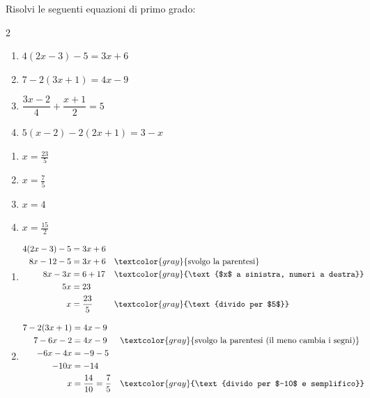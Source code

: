 
\begin{question}[ID=2.4, subtitle={Equazioni di primo grado}, difficulty=media, tags={equazioni lineari}]
Risolvi le seguenti equazioni di primo grado:
\begin{multicols}{2}
\begin{enumerate}[leftmargin=3cm]
    \item $4(2x-3) - 5 = 3x + 6$
    \item $7 - 2(3x+1) = 4x - 9$
    \item $\dfrac{3x-2}{4} + \dfrac{x+1}{2} = 5$
    \item $5(x-2) - 2(2x+1) = 3 - x$
\end{enumerate}
\end{multicols}
\begin{solution}
\begin{enumerate}
    \item $x=\tfrac{23}{5}$
    \item $x=\tfrac{7}{5}$
    \item $x=4$
    \item $x=\tfrac{15}{2}$
\end{enumerate}
\end{solution}
\begin{explanation}
\begin{enumerate}
    \item \[\begin{aligned}
    4(2x-3)-5 &= 3x+6\\
    8x-12-5 &= 3x+6 && \textcolor{gray}{\text{svolgo la parentesi}}\\
    8x-3x &= 6+17 && \textcolor{gray}{\text{$x$ a sinistra, numeri a destra}}\\
    5x &= 23\\
    x &= \dfrac{23}{5} && \textcolor{gray}{\text{divido per $5$}}
    \end{aligned}\]
    \item \[\begin{aligned}
    7-2(3x+1) &= 4x-9\\
    7-6x-2 &= 4x-9 && \textcolor{gray}{\text{svolgo la parentesi (il meno cambia i segni)}}\\
    -6x-4x &= -9-5\\
    -10x &= -14\\
    x &= \dfrac{14}{10}=\dfrac75 && \textcolor{gray}{\text{divido per $-10$ e semplifico}}
    \end{aligned}\]

\end{enumerate}
\end{explanation}
\end{question}
